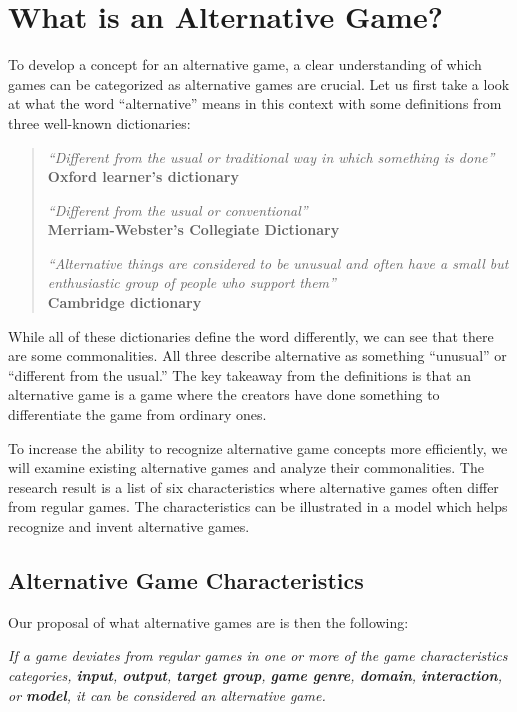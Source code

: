 \section{What is an Alternative Game?}
\label{chap:what_is_alternative_game}

To develop a concept for an alternative game, a clear understanding of which games can be categorized as alternative games are crucial. Let us first take a look at what the word “alternative” means in this context with some definitions from three well-known dictionaries:

\blockquote{
    \textit{“Different from the usual or traditional way in which something is done”} \\
    \textbf{Oxford learner's dictionary}
    
    \textit{“Different from the usual or conventional”} \\
    \textbf{Merriam-Webster's Collegiate Dictionary}
     
    \textit{“Alternative things are considered to be unusual and often have a small but enthusiastic group of people who support them”} \\
    \textbf{Cambridge dictionary}
}

While all of these dictionaries define the word differently, we can see that there are some commonalities. All three describe alternative as something “unusual” or “different from the usual.” The key takeaway from the definitions is that an alternative game is a game where the creators have done something to differentiate the game from ordinary ones.

To increase the ability to recognize alternative game concepts more efficiently, we will examine existing alternative games and analyze their commonalities. The research result is a list of six characteristics where alternative games often differ from regular games. The characteristics can be illustrated in a model which helps recognize and invent alternative games.

\subsection{Alternative Game Characteristics}
Our proposal of what alternative games are is then the following:

\textit{If a game deviates from regular games in one or more of the game characteristics categories, \textbf{input}, \textbf{output}, \textbf{target group}, \textbf{game genre}, \textbf{domain}, \textbf{interaction}, or \textbf{model}, it can be considered an alternative game.}

